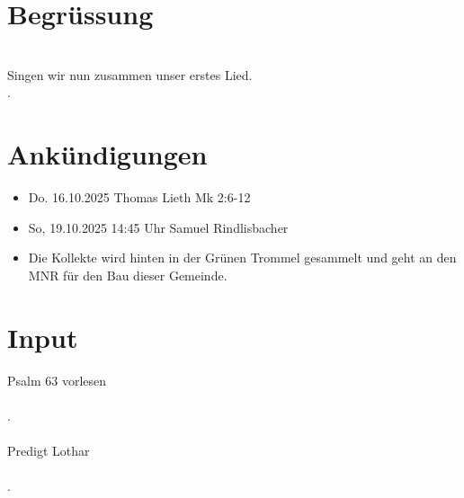 \documentclass{../../inc/mybib}
\begin{document}
\section{Begrüssung}

\beten{}
\\
Singen wir nun zusammen unser erstes Lied.
\\
.

\section{Ankündigungen}
\begin{itemize}
    \item {} Do. 16.10.2025 Thomas Lieth Mk 2:6-12
    \item {} So, 19.10.2025 14:45 Uhr Samuel Rindlisbacher
    \item Die Kollekte wird hinten in der Grünen Trommel gesammelt und geht an den MNR für den Bau dieser Gemeinde.
\end{itemize}

\section{ Input }

    Psalm 63 vorlesen\\    
    \\    
    .\\
    \\
    Predigt Lothar\\
    \\
    .
\end{document}
